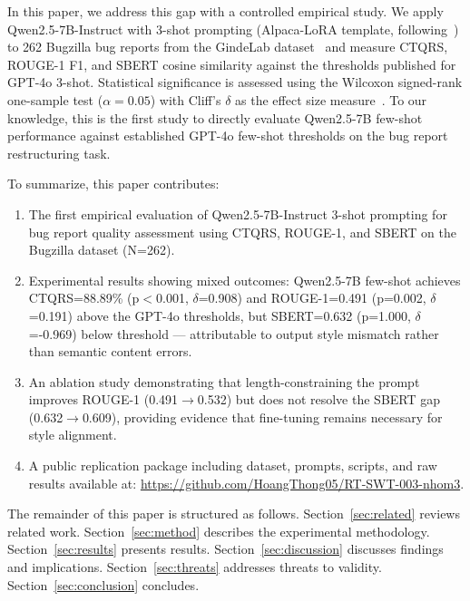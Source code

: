 In this paper, we address this gap with a controlled empirical study. 
We apply Qwen2.5-7B-Instruct with 3-shot prompting (Alpaca-LoRA template, 
following~\cite{acharya2025bugquality}) to 262 Bugzilla bug reports from 
the GindeLab dataset~\cite{acharya2025bugquality} and measure CTQRS, 
ROUGE-1 F1, and SBERT cosine similarity against the thresholds published 
for GPT-4o 3-shot. Statistical significance is assessed using the 
Wilcoxon signed-rank one-sample test ($\alpha = 0.05$) with Cliff's $\delta$ 
as the effect size measure~\cite{arcuri2011practical}. 
To our knowledge, this is the first study to directly evaluate 
Qwen2.5-7B few-shot performance against established GPT-4o few-shot 
thresholds on the bug report restructuring task.

To summarize, this paper contributes:
\begin{enumerate}
    \item The first empirical evaluation of Qwen2.5-7B-Instruct 3-shot 
    prompting for bug report quality assessment using CTQRS, ROUGE-1, 
    and SBERT on the Bugzilla dataset (N=262).
    
    \item Experimental results showing mixed outcomes: Qwen2.5-7B 
    few-shot achieves CTQRS=88.89\% (p$<$0.001, $\delta$=0.908) and 
    ROUGE-1=0.491 (p=0.002, $\delta$=0.191) above the GPT-4o thresholds, 
    but SBERT=0.632 (p=1.000, $\delta$=-0.969) below threshold --- 
    attributable to output style mismatch rather than semantic content errors.
    
    \item An ablation study demonstrating that length-constraining the 
    prompt improves ROUGE-1 (0.491$\rightarrow$0.532) but does not resolve 
    the SBERT gap (0.632$\rightarrow$0.609), providing evidence that 
    fine-tuning remains necessary for style alignment.
    
    \item A public replication package including dataset, prompts, scripts, 
    and raw results available at: 
    \url{https://github.com/HoangThong05/RT-SWT-003-nhom3}.
\end{enumerate}

The remainder of this paper is structured as follows. 
Section~\ref{sec:related} reviews related work. 
Section~\ref{sec:method} describes the experimental methodology. 
Section~\ref{sec:results} presents results. 
Section~\ref{sec:discussion} discusses findings and implications. 
Section~\ref{sec:threats} addresses threats to validity. 
Section~\ref{sec:conclusion} concludes.
